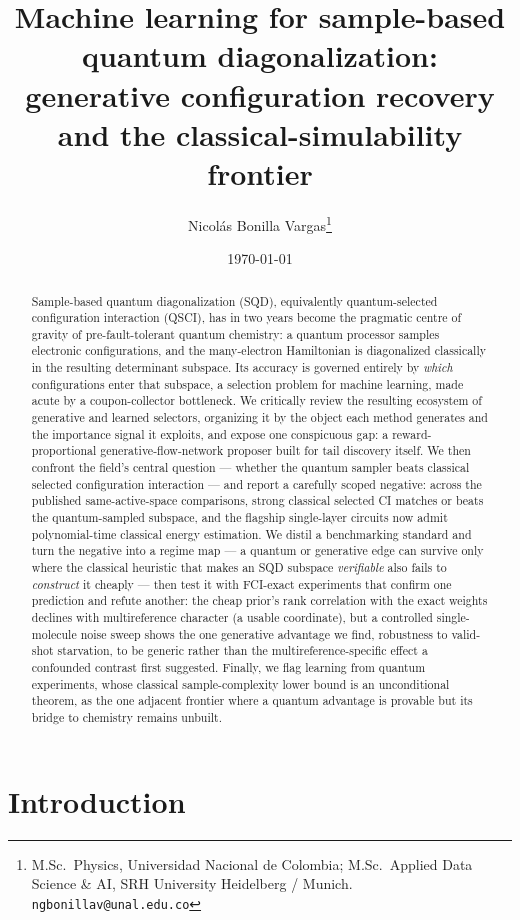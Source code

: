 \documentclass[11pt]{article}
\title{\vspace{-1.2cm}\bfseries Machine learning for sample-based quantum diagonalization: generative configuration recovery and the classical-simulability frontier}
\author{Nicol\'as Bonilla Vargas\thanks{M.Sc.\ Physics, Universidad Nacional de Colombia; M.Sc.\ Applied Data Science \& AI, SRH University Heidelberg / Munich. \texttt{ngbonillav@unal.edu.co}}}
\date{\today}
\begin{document}
\maketitle
\begin{abstract}
Sample-based quantum diagonalization (SQD), equivalently quantum-selected configuration interaction (QSCI), has in two years become the pragmatic centre of gravity of pre-fault-tolerant quantum chemistry: a quantum processor samples electronic configurations, and the many-electron Hamiltonian is diagonalized classically in the resulting determinant subspace. Its accuracy is governed entirely by \emph{which} configurations enter that subspace, a selection problem for machine learning, made acute by a coupon-collector bottleneck. We critically review the resulting ecosystem of generative and learned selectors, organizing it by the object each method generates and the importance signal it exploits, and expose one conspicuous gap: a reward-proportional generative-flow-network proposer built for tail discovery itself. We then confront the field's central question --- whether the quantum sampler beats classical selected configuration interaction --- and report a carefully scoped negative: across the published same-active-space comparisons, strong classical selected CI matches or beats the quantum-sampled subspace, and the flagship single-layer circuits now admit polynomial-time classical energy estimation. We distil a benchmarking standard and turn the negative into a regime map --- a quantum or generative edge can survive only where the classical heuristic that makes an SQD subspace \emph{verifiable} also fails to \emph{construct} it cheaply --- then test it with FCI-exact experiments that confirm one prediction and refute another: the cheap prior's rank correlation with the exact weights declines with multireference character (a usable coordinate), but a controlled single-molecule noise sweep shows the one generative advantage we find, robustness to valid-shot starvation, to be generic rather than the multireference-specific effect a confounded contrast first suggested. Finally, we flag learning from quantum experiments, whose classical sample-complexity lower bound is an unconditional theorem, as the one adjacent frontier where a quantum advantage is provable but its bridge to chemistry remains unbuilt.
\end{abstract}

\section{Introduction}\label{sec:1}
\end{document}
